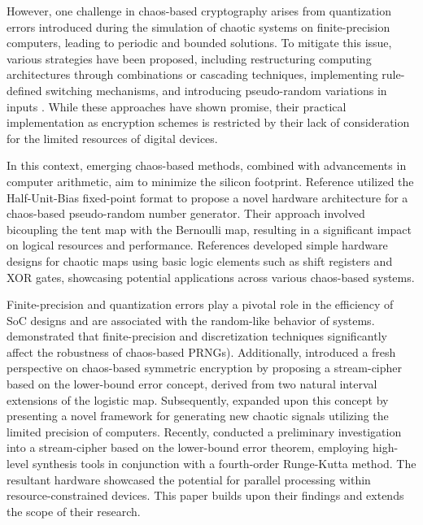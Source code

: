 However, one challenge in chaos-based cryptography arises from quantization errors introduced during the simulation of chaotic systems on finite-precision computers, leading to periodic and bounded solutions. To mitigate this issue, various strategies have been proposed, including restructuring computing architectures through combinations or cascading techniques, implementing rule-defined switching mechanisms, and introducing pseudo-random variations in inputs \cite{Alawida.2024}. While these approaches have shown promise, their practical implementation as encryption schemes is restricted by their lack of consideration for the limited resources of digital devices.

In this context, emerging chaos-based methods, combined with advancements in computer arithmetic, aim to minimize the silicon footprint. Reference \cite{DaSilva.2023} utilized the Half-Unit-Bias fixed-point format to propose a novel hardware architecture for a chaos-based pseudo-random number generator. Their approach involved bicoupling the tent map with the Bernoulli map, resulting in a significant impact on logical resources and performance. References \cite{Nardo.2019} developed simple hardware designs for chaotic maps using basic logic elements such as shift registers and XOR gates, showcasing potential applications across various chaos-based systems.

Finite-precision and quantization errors play a pivotal role in the efficiency of SoC designs and are associated with the random-like behavior of systems. \cite{Tutueva.2021} demonstrated that finite-precision and discretization techniques significantly affect the robustness of chaos-based PRNGs). Additionally, \cite{Nepomuceno.2019} introduced a fresh perspective on chaos-based symmetric encryption by proposing a stream-cipher based on the lower-bound error concept, derived from two natural interval extensions of the logistic map. Subsequently, \cite{Zhou.2023} expanded upon this concept by presenting a novel framework for generating new chaotic signals utilizing the limited precision of computers.
Recently, \cite{Lima.2023} conducted a preliminary investigation into a stream-cipher based on the lower-bound error theorem, employing high-level synthesis tools in conjunction with a fourth-order Runge-Kutta method. The resultant hardware showcased the potential for parallel processing within resource-constrained devices. This paper builds upon their findings and extends the scope of their research.
